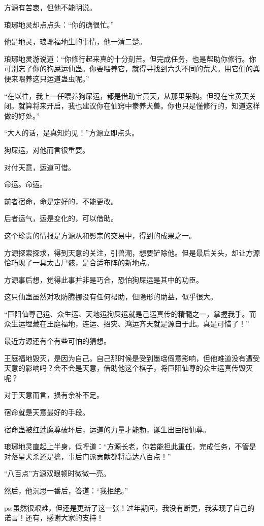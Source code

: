 \begin{this_body}
方源有苦衷，但他不能明说。

琅琊地灵却点点头：“你的确很忙。”

他是地灵，琅琊福地生的事情，他一清二楚。

琅琊地灵游说道：“你修行起来真的十分刻苦。但完成任务，也是帮助你修行。你可别忘了你的狗屎运仙蛊。你要喂养它，就得寻找到六头不同的荒犬。用它们的粪便来喂养这只运道蛊虫呢。”

“在以往，我上一任喂养狗屎运，都是借助宝黄天，从那里采购。但现在宝黄天关闭。就算将来开启，我也建议你在仙窍中豢养犬兽。你也只是懂修行的，知道这样做的好处。”

“大人的话，是真知灼见！”方源立即点头。

狗屎运，对他而言很重要。

对付天意，运道可借。

命运。命运。

前者宿命，命是定好的，不能更改。

后者运气，运是变化的，可以借助。

这个珍贵的情报是方源从和影宗的交易中，得到的成果之一。

方源探索探求，得到天意的关注，引兽潮，想要铲除他。但是最后关头，却让方源恰巧现了一具太古尸骸，是合适布阵的新地点。

方源事后想，觉得此事并非是巧合，恐怕狗屎运是其中的功臣。

这只仙蛊虽然对攻防腾挪没有任何帮助，但隐形的助益，似乎很大。

“巨阳仙尊己运、众生运、天地运狗屎运就是己运真传的精髓之一，掌握我手。而众生运埋藏在王庭福地，连运、招灾、鸿运齐天就是源自于此。真是可惜了！”

最近方源还有个有些可怕的猜想。

王庭福地毁灭，是因为自己。自己那时候是受到墨瑶假意影响，但他难道没有遭受天意的影响吗？会不会是天意，借助他这个棋子，将巨阳仙尊的众生运真传毁灭呢？

对于天意而言，损有余补不足。

宿命就是天意最好的手段。

宿命蛊被红莲魔尊破坏后，运道的力量才能勃，诞生出巨阳仙尊。

琅琊地灵直起上半身，低呼道：“方源长老，你若能担此重任，完成任务，不管是对落星犬杀还是擒，事后门派贡献都将高达八百点！”

“八百点”方源双眼顿时微微一亮。

然后，他沉思一番后，答道：“我拒绝。”

ps:虽然很艰难，但还是更新了这一张！过年期间，我没有断更，我实现了自己的诺言！还有，感谢大家的支持！

\end{this_body}

